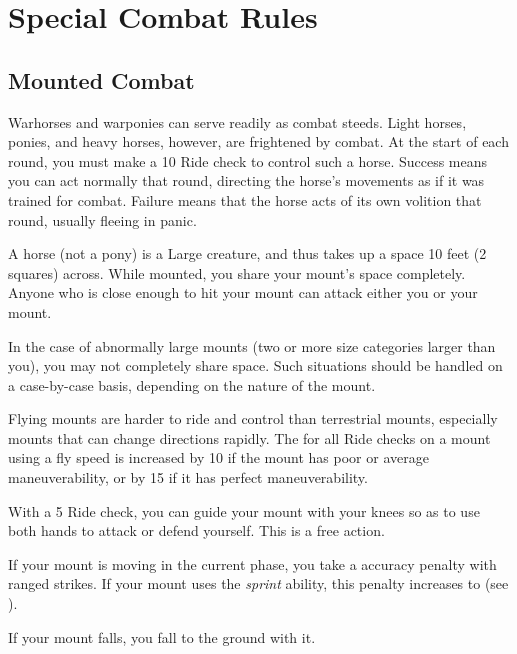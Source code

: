 \section{Special Combat Rules}

    \subsection{Mounted Combat}\label{Mounted Combat}
         Warhorses and warponies can serve readily as combat steeds. Light horses, ponies, and heavy horses, however, are frightened by combat.
        At the start of each round, you must make a  10 Ride check to control such a horse.
        Success means you can act normally that round, directing the horse's movements as if it was trained for combat.
        Failure means that the horse acts of its own volition that round, usually fleeing in panic.

         A horse (not a pony) is a Large creature, and thus takes up a space 10 feet (2 squares) across. While mounted, you share your mount's space completely. Anyone who is close enough to hit your mount can attack either you or your mount.

        In the case of abnormally large mounts (two or more size categories larger than you), you may not completely share space. Such situations should be handled on a case-by-case basis, depending on the nature of the mount.

         Flying mounts are harder to ride and control than terrestrial mounts, especially mounts that can change directions rapidly.
        The  for all Ride checks on a mount using a fly speed is increased by 10 if the mount has poor or average maneuverability, or by 15 if it has perfect maneuverability.

         With a  5 Ride check, you can guide your mount with your knees so as to use both hands to attack or defend yourself. This is a free action.

        If your mount is moving in the current phase, you take a  accuracy penalty with ranged strikes.
        If your mount uses the \textit{sprint} ability, this penalty increases to  (see ).

         If your mount falls, you fall to the ground with it.

